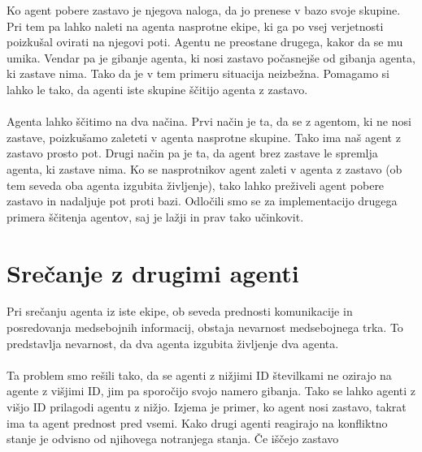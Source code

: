 \documentclass[12pt,a4paper,openany]{book}
\begin{document}
Ko agent pobere zastavo je njegova naloga, da jo prenese v bazo svoje skupine. Pri tem pa lahko
 naleti na agenta nasprotne ekipe, ki ga po vsej verjetnosti poizkušal ovirati na njegovi poti.
 Agentu ne preostane drugega, kakor da se mu umika. Vendar pa je gibanje agenta, ki nosi zastavo
 počasnejše od gibanja agenta, ki zastave nima. Tako da je v tem primeru situacija neizbežna. 
Pomagamo si lahko le tako, da agenti iste skupine ščitijo agenta z zastavo.\\
\\
Agenta lahko ščitimo na dva načina. Prvi način je ta, da se z agentom, ki ne nosi zastave, 
poizkušamo zaleteti v  agenta nasprotne skupine. Tako ima naš agent z zastavo prosto pot. 
Drugi način pa je ta, da agent brez zastave le spremlja agenta, ki zastave nima. Ko se 
nasprotnikov agent zaleti v agenta z zastavo (ob tem seveda oba agenta izgubita življenje), 
tako lahko preživeli agent pobere zastavo in nadaljuje pot proti bazi. Odločili smo se za 
implementacijo drugega primera ščitenja agentov, saj je lažji in prav tako učinkovit.


\section{Srečanje z drugimi agenti}

Pri srečanju agenta iz iste ekipe, ob seveda prednosti komunikacije in posredovanja  medsebojnih informacij, 
obstaja nevarnost medsebojnega trka. To predstavlja nevarnost, da dva agenta izgubita življenje dva agenta.\\
\\
Ta problem smo rešili tako, da se agenti z nižjimi ID številkami ne ozirajo na agente z višjimi ID, jim pa 
sporočijo svojo namero gibanja. Tako se lahko agenti z višjo ID prilagodi agentu z nižjo. Izjema je primer, 
ko agent nosi zastavo, takrat ima ta agent prednost pred vsemi. Kako drugi agenti reagirajo na konfliktno 
stanje je odvisno od njihovega notranjega stanja. Če iščejo zastavo 
\end{document}
